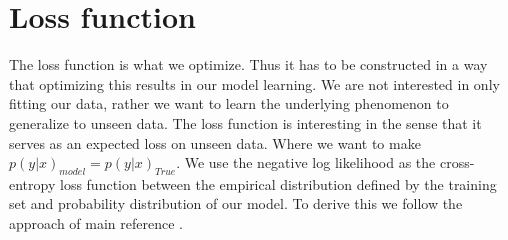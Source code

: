 \section{Loss function}
\label{sec:loss-functions}
The loss function is what we optimize. 
Thus it has to be constructed in a way that optimizing this results in our model learning.
We are not interested in only fitting our data, rather we want to learn the underlying phenomenon to generalize to unseen data.
The loss function is interesting in the sense that it serves as an expected loss on unseen data.
Where we want to make $p(y|x)_{model} = p(y|x)_{True}$.
We use the negative log likelihood as the cross-entropy loss function between the empirical distribution defined by the training set and probability distribution of our model.
To derive this we follow the approach of main reference \cite[see][sec 3.13]{goodfellowDeepLearning2016}.  

